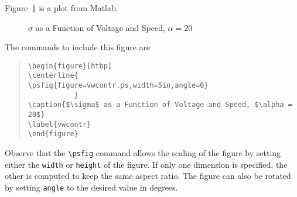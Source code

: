 Figure~\ref{vwcontr} is a plot from Matlab.
\begin{figure}[htbp]
\centerline{
           }
\caption{$\sigma$ as a Function of Voltage and Speed, $\alpha = 20$}
\label{vwcontr}
\end{figure}
The commands to include this figure are
\begin{quote}\tt\singlespace\begin{verbatim}
\begin{figure}[htbp]
\centerline{
\psfig{figure=vwcontr.ps,width=5in,angle=0}
           }
\caption{$\sigma$ as a Function of Voltage and Speed, $\alpha = 20$}
\label{vwcontr}
\end{figure}
\end{verbatim}\end{quote}

Observe that the {\tt \verb|\psfig|} command allows the scaling of the figure
by setting either the {\tt width} or {\tt height} of the figure.  If only one
dimension is specified, the other is computed to keep the same aspect ratio.
The figure can also be rotated by setting {\tt angle} to the desired value in
degrees.
